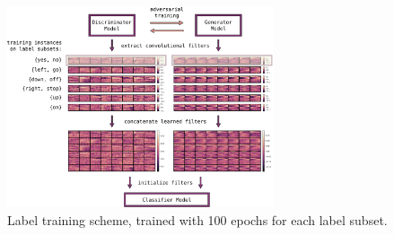 \begin{figure}[!ht]
  \centering
    \includegraphics[width=0.7\textwidth]{./4_nn/figs/nn_adv_label_scheme}
  \caption{Label training scheme, trained with 100 epochs for each label subset.}
  \label{fig:nn_adv_label_scheme}
\end{figure}
\FloatBarrier
\noindent





